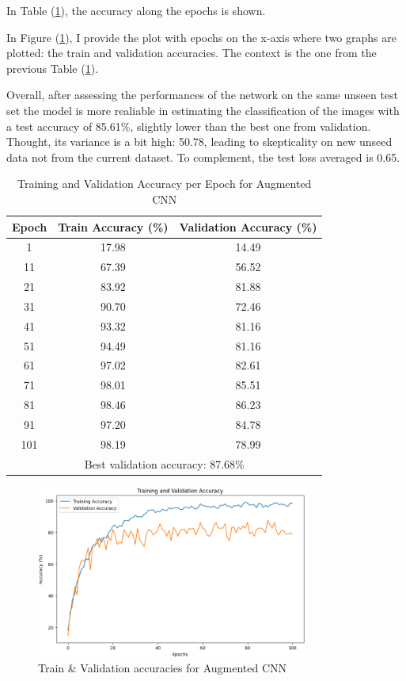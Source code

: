\documentclass[11pt]{scrartcl}
\begin{document}
In Table (\ref{tab:task2-aug-accuracy}),
the accuracy along the epochs is shown.

In Figure (\ref{fig:task2-aug-accuracy}), 
I provide the plot with epochs on the x-axis where two graphs are plotted:
the train and validation accuracies.
The context is the one from the previous Table (\ref{tab:task2-aug-accuracy}). 

Overall, after assessing the performances of the network on the same unseen test set
the model is more realiable in estimating the classification of the images with
a test accuracy of 85.61\%, 
slightly lower than the best one from validation. 
Thought, its variance is a bit high: 50.78,
leading to skepticality on new unseed data not from the current dataset.
To complement, the test loss averaged is 0.65.

\begin{table}[htbp]
\centering
\caption{Training and Validation Accuracy per Epoch for Augmented CNN}
\begin{tabular}{ccc}
\toprule
\textbf{Epoch} & \textbf{Train Accuracy (\%)} & \textbf{Validation Accuracy (\%)} \\
\midrule
1    & 17.98  & 14.49  \\
11   & 67.39  & 56.52  \\
21   & 83.92  & 81.88  \\
31   & 90.70  & 72.46  \\
41   & 93.32  & 81.16  \\
51   & 94.49  & 81.16  \\
61   & 97.02  & 82.61  \\
71   & 98.01  & 85.51  \\
81   & 98.46  & 86.23  \\
91   & 97.20  & 84.78  \\
101  & 98.19  & 78.99  \\
\midrule
\multicolumn{3}{c}{Best validation accuracy: 87.68\%} \\
\bottomrule
\end{tabular}
\label{tab:task2-aug-accuracy}
\end{table}

\begin{figure}[htbp]
\centering
\includegraphics[width=0.8\textwidth]{./figures/task2-aug-accuracy.png}
\caption{Train \& Validation accuracies for Augmented CNN}
\label{fig:task2-aug-accuracy}
\end{figure}
\end{document}
